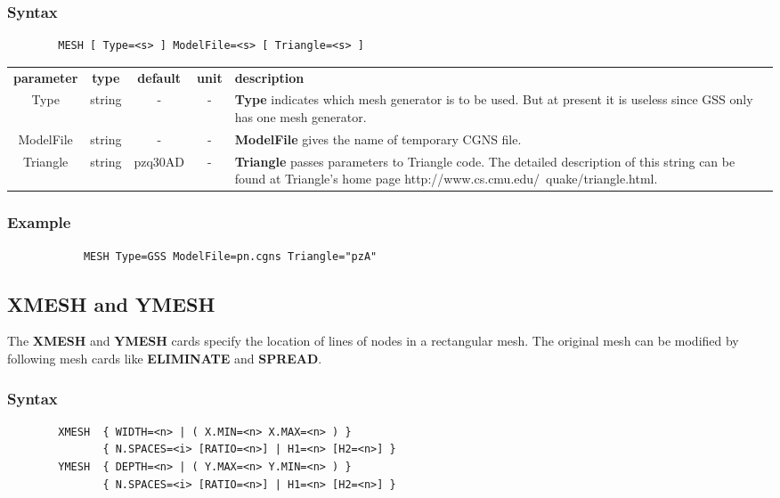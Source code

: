 \documentclass[11pt,pdftex]{article}
\begin{document}
\subsubsection*{Syntax}
\begin{verbatim}
        MESH [ Type=<s> ] ModelFile=<s> [ Triangle=<s> ]
\end{verbatim}

\small
\noindent\begin{longtable}{ccccp{7cm}}
\textbf{parameter}   & \textbf{type}  & \textbf{default} & \textbf{unit} & \textbf{description} \\
Type        & string  & -    & -      & \textbf{Type} indicates which mesh generator is to be used.
                                        But at present it is useless since GSS only has one mesh generator. \\
ModelFile   & string  & -    & -      & \textbf{ModelFile} gives the name of temporary CGNS file. \\
Triangle    & string  & pzq30AD  & -  & \textbf{Triangle} passes parameters to Triangle code.
                                        The detailed description of this string can be found at Triangle's home page
                                        http://www.cs.cmu.edu/~quake/triangle.html.\\
\end{longtable}
\normalsize

\subsubsection*{Example}
\begin{verbatim}
            MESH Type=GSS ModelFile=pn.cgns Triangle="pzA"
\end{verbatim}


\newpage
\subsection{XMESH and YMESH}
The \textbf{XMESH} and \textbf{YMESH} cards specify the location of
lines of nodes in a rectangular mesh. The original mesh can be
modified by following mesh cards like \textbf{ELIMINATE} and
\textbf{SPREAD}.

\subsubsection*{Syntax}
\begin{verbatim}
        XMESH  { WIDTH=<n> | ( X.MIN=<n> X.MAX=<n> ) }
               { N.SPACES=<i> [RATIO=<n>] | H1=<n> [H2=<n>] }
        YMESH  { DEPTH=<n> | ( Y.MAX=<n> Y.MIN=<n> ) }
               { N.SPACES=<i> [RATIO=<n>] | H1=<n> [H2=<n>] }
\end{verbatim}
\end{document}
